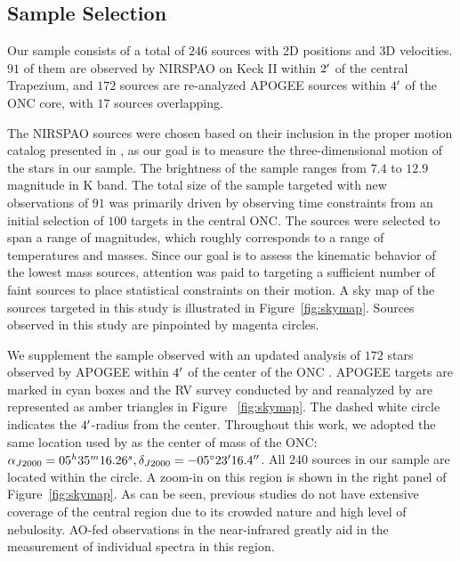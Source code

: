 \documentclass[12pt]{ucsddissertation}
\begin{document}
\begin{CJK*}{UTF8}{gbsn}
\subsection{Sample Selection}
\label{onc-subsec:sample}

Our sample consists of a total of $246$ sources with 2D positions and 3D velocities. $91$ of them are observed by NIRSPAO on Keck II within $2\mbox{$^\prime$}$ of the central Trapezium, and $172$ sources are re-analyzed APOGEE sources within $4\mbox{$^\prime$}$ of the ONC core, with $17$ sources overlapping.

The NIRSPAO sources were chosen based on their inclusion in the proper motion catalog presented in , as our goal is to measure the three-dimensional motion of the stars in our sample. The brightness of the sample ranges from $7.4$ to $12.9$ magnitude in K band.  The total size of the sample targeted with new observations of $91$ was primarily driven by observing time constraints from an initial selection of $100$ targets in the central ONC.  The sources were selected to span a range of magnitudes, which roughly corresponds to a range of temperatures and masses.  Since our goal is to assess the kinematic behavior of the lowest mass sources, attention was paid to targeting a sufficient number of faint sources to place statistical constraints on their motion.  A sky map of the sources targeted in this study is illustrated in Figure~\ref{fig:skymap}. Sources observed in this study are pinpointed by magenta circles. 

We supplement the sample observed with an updated analysis of $172$ stars observed by APOGEE within $4\mbox{$^\prime$}$ of the center of the ONC . APOGEE targets are marked in cyan boxes and the RV survey conducted by \citet{Tobin-2009} and reanalyzed by \citet{Kounkel-2016} are represented as amber triangles in Figure ~\ref{fig:skymap}. The dashed white circle indicates the $4\mbox{$^\prime$}$-radius from the center. Throughout this work, we adopted the same location used by \citep[][]{DaRio-2014} as the center of mass of the ONC: $\alpha_{J2000}=05^h35^m16.26^s, \delta_{J2000}=-05^\circ23\mbox{$^\prime$}16.4\mbox{$^{\prime\prime}$}$. All $240$ sources in our sample are located within the circle. A zoom-in on this region is shown in the right panel of Figure~\ref{fig:skymap}. As can be seen, previous studies do not have extensive coverage of the central region due to its crowded nature and high level of nebulosity. AO-fed observations in the near-infrared greatly aid in the measurement of individual spectra in this region.


\end{CJK*}
\end{document}

